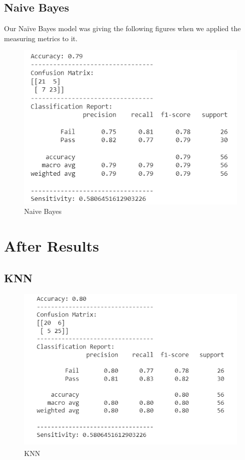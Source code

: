 \documentclass[12pt,a4paper]{article}
\begin{document}
\subsection{Naive Bayes}
Our Naïve Bayes model was giving the following figures when we applied the measuring metrics to it.
\begin{figure}[h]
    \centering
    \includegraphics[scale=0.60]{Other/Naive_Baiyesin.png}
    \caption{Naive Bayes}
\end{figure}


\newpage
\section{After Results}
\subsection{KNN}
\begin{figure}[h]
    \centering
    \includegraphics[scale=0.60]{Other/After_KNN.png}
    \caption{KNN}
\end{figure}
\end{document}
